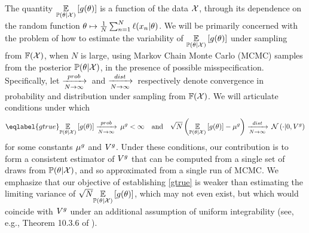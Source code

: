 The quantity $\underset{\mathbb{P}(\theta | {\mathcal{X}})}{\mathbb{E}}\left[g(\theta)\right]$ is a function of the data ${\mathcal{X}}$,
through its dependence on the random function $\theta \mapsto \frac{1}{N}\sum_{n=1}^N \ell(x_n
\vert \theta)$.  We will be primarily concerned with the problem of how to
estimate the variability of $\underset{\mathbb{P}(\theta | {\mathcal{X}})}{\mathbb{E}}\left[g(\theta)\right]$ under sampling from
$\mathbb{F}({\mathcal{X}})$, when $N$ is large, using Markov Chain Monte Carlo (MCMC)
samples from the posterior $\mathbb{P}(\theta | {\mathcal{X}})$, in the presence of possible
misspecification.
%
Specifically, let $\xrightarrow[N\rightarrow\infty]{prob}\,$ and $\xrightarrow[N\rightarrow\infty]{dist}\,$ respectively denote convergence in
probability and distribution under sampling from $\mathbb{F}({\mathcal{X}})$. We will
articulate conditions under which
%
\begin{align}\eqlabel{gtrue}
%
\expect{\post}{\g(\theta)} \plim \gmeantrue < \infty
\quad\textrm{and}\quad
\sqrt{N}\left(\expect{\post}{\g(\theta)} - \gmeantrue \right)
\dlim
\normdist\left(\cdot \vert 0, \gcovtrue\right)
%
\end{align}
for some constants $\mu^g$ and $V^g$.  Under these conditions, our
contribution is to form a consistent estimator of $V^g$ that can be
computed from a single set of draws from $\mathbb{P}(\theta | {\mathcal{X}})$, and so approximated from a
single run of MCMC.  We emphasize that our objective of establishing
\eqref{gtrue} is weaker than estimating the limiting variance of $\sqrt{N}
\underset{\mathbb{P}(\theta | {\mathcal{X}})}{\mathbb{E}}\left[g(\theta)\right]$, which may not even exist, but which would coincide
with $V^g$ under an additional assumption of uniform integrability (see,
e.g., Theorem 10.3.6 of \citet{dudley:2018:realanalysis}).








